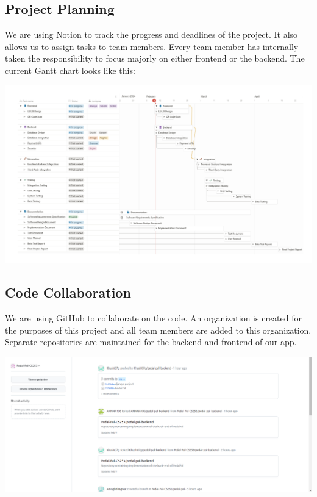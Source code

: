 \documentclass[11pt]{article}
\begin{document}
\newpage
\section{}
\subsection{Project Planning}
We are using Notion to track the progress and deadlines of the project. It also allows us to assign tasks to team members. Every team member has internally taken the responsibility to focus majorly on either
frontend or the backend. The current Gantt chart looks like this:
\begin{center}
  \includegraphics[scale=0.1]{project-plan-images/notion.png}
\end{center}

\subsection{Code Collaboration}
We are using GitHub to collaborate on the code. An organization is created for the purposes of this project and all team members are added to this organization. Separate repositories are maintained for the backend and frontend of our app. 
\begin{center}
  \includegraphics[scale=0.3]{project-plan-images/github.png}
\end{center}
\end{document}
